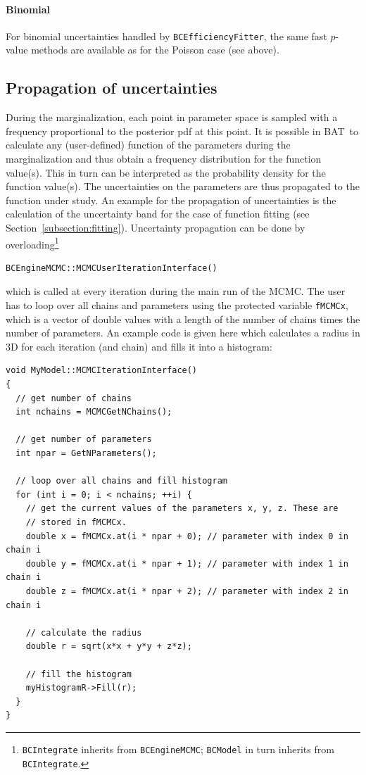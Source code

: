 \documentclass[11pt, a4paper]{article}
\newcommand{\bat}{{\sc BAT}}
\newcommand{\code}[1]{\texttt{#1}}
\begin{document}
\paragraph{Binomial} For binomial uncertainties handled by
\verb|BCEfficiencyFitter|, the same fast $p$-value methods are available as for
the Poisson case (see above).


\subsection{Propagation of uncertainties}

During the marginalization, each point in parameter space is sampled
with a frequency proportional to the posterior pdf at this point. It
is possible in \bat\ to calculate any (user-defined) function of the
parameters during the marginalization and thus obtain a frequency
distribution for the function value(s). This in turn can be
interpreted as the probability density for the function value(s). The
uncertainties on the parameters are thus propagated to the function
under study. An example for the propagation of uncertainties is the
calculation of the uncertainty band for the case of function fitting
(see Section~\ref{subsection:fitting}).  Uncertainty propagation can
be done by overloading\footnote{\code{BCIntegrate} inherits from
  \code{BCEngineMCMC}; \code{BCModel} in turn inherits from
  \code{BCIntegrate}.}
%
\begin{verbatim}
BCEngineMCMC::MCMCUserIterationInterface()
\end{verbatim}
%
which is called at every iteration during the main run of the
MCMC. The user has to loop over all chains and parameters using the
protected variable \verb|fMCMCx|, which is a vector of double values
with a length of the number of chains times the number of
parameters. An example code is given here which calculates a radius in
3D for each iteration (and chain) and fills it into a histogram:

\begin{verbatim}
void MyModel::MCMCIterationInterface()
{
  // get number of chains
  int nchains = MCMCGetNChains();

  // get number of parameters
  int npar = GetNParameters();

  // loop over all chains and fill histogram
  for (int i = 0; i < nchains; ++i) {
    // get the current values of the parameters x, y, z. These are
    // stored in fMCMCx.
    double x = fMCMCx.at(i * npar + 0); // parameter with index 0 in chain i
    double y = fMCMCx.at(i * npar + 1); // parameter with index 1 in chain i
    double z = fMCMCx.at(i * npar + 2); // parameter with index 2 in chain i

    // calculate the radius
    double r = sqrt(x*x + y*y + z*z);

    // fill the histogram
    myHistogramR->Fill(r);
  }
}
\end{verbatim}
\end{document}
